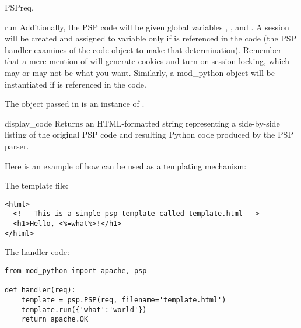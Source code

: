 \begin{classdesc}{PSP}{req, }
\begin{methoddesc}[PSP]{run}{}
    Additionally, the PSP code will be given global variables
    , ,  and . A session
    will be created and assigned to  variable only if
     is referenced in the code (the PSP handler examines
     of the code object to make that
    determination). Remember that a mere mention of 
    will generate cookies and turn on session locking, which may or
    may not be what you want. Similarly, a mod_python
     object will be instantiated if  is
    referenced in the code.

    The object passed in  is an instance of
    .

  \end{methoddesc}

  \begin{methoddesc}[PSP]{display_code}{}
    Returns an HTML-formatted string representing a side-by-side
    listing of the original PSP code and resulting Python code
    produced by the PSP parser. 
  \end{methoddesc}

  Here is an example of how  can be used as a templating
  mechanism:
  
  The template file:
  \begin{verbatim}
<html>
  <!-- This is a simple psp template called template.html -->
  <h1>Hello, <%=what%>!</h1>
</html>
  \end{verbatim}
  The handler code:
  \begin{verbatim}
from mod_python import apache, psp

def handler(req):
    template = psp.PSP(req, filename='template.html')
    template.run({'what':'world'})
    return apache.OK
  \end{verbatim}

\end{classdesc}

